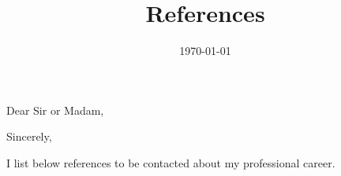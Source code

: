 \documentclass[10pt,a4paper,sans,colorlinks]{moderncv}
\title{References}
\begin{document}
\hfHyperrefSetupBlueLinks

\recipient{\ }{}
\opening{Dear Sir or Madam,}
\date{\today}
\closing{Sincerely,}

\makelettertitle

I list below references to be contacted about my professional career.



\makeletterclosing
\end{document}
